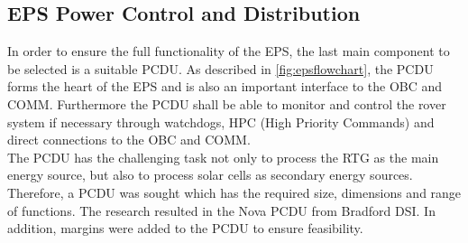 

\subsection{EPS Power Control and Distribution}
In order to ensure the full functionality of the EPS, the last main component to be selected is a suitable PCDU. As described in \autoref{fig:epsflowchart}, the PCDU forms the heart of the EPS and is also an important interface to the OBC and COMM. Furthermore the PCDU shall be able to monitor and control the rover system if necessary through watchdogs, HPC (High Priority Commands) and direct connections to the OBC and COMM.\\
The PCDU has the challenging task not only to process the RTG as the main energy source, but also to process solar cells as secondary energy sources. Therefore, a PCDU was sought which has the required size, dimensions and range of functions. The research resulted in the Nova PCDU from Bradford DSI. In addition, margins were added to the PCDU to ensure feasibility.


